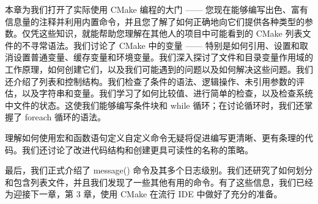 本章为我们打开了实际使用 CMake 编程的大门 —— 您现在能够编写出色、富有信息量的注释并利用内置命令，并且您了解了如何正确地向它们提供各种类型的参数。仅凭这些知识，就能帮助您理解在其他人的项目中可能看到的 CMake 列表文件的不寻常语法。我们讨论了 CMake 中的变量 —— 特别是如何引用、设置和取消设置普通变量、缓存变量和环境变量。我们深入探讨了文件和目录变量作用域的工作原理，如何创建它们，以及我们可能遇到的问题以及如何解决这些问题。我们还介绍了列表和控制结构。我们检查了条件的语法、逻辑操作、未引用参数的评估，以及字符串和变量。我们学习了如何比较值、进行简单的检查，以及检查系统中文件的状态。这使我们能够编写条件块和 while 循环；在讨论循环时，我们还掌握了 foreach 循环的语法。

理解如何使用宏和函数语句定义自定义命令无疑将促进编写更清晰、更有条理的代码。我们还讨论了改进代码结构和创建更具可读性的名称的策略。

最后，我们正式介绍了 message() 命令及其多个日志级别。我们还研究了如何划分和包含列表文件，并且我们发现了一些其他有用的命令。有了这些信息，我们已经为迎接下一章，第 3 章，使用 CMake 在流行 IDE 中做好了充分的准备。
